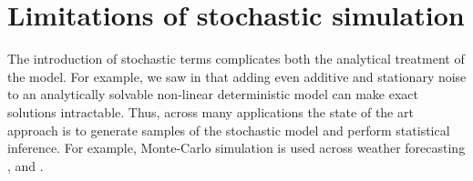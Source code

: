 




\section{Limitations of stochastic simulation}
The introduction of stochastic terms complicates both the analytical treatment of the model.
For example, we saw in  that adding even additive and  stationary noise to an analytically solvable non-linear deterministic model can make exact solutions intractable.
Thus, across many applications the state of the art approach is to generate samples of the stochastic model and perform statistical inference.
For example, Monte-Carlo simulation is used across weather forecasting \citep{LeutbecherEtAl_2017_StochasticRepresentationsModel},  and .

